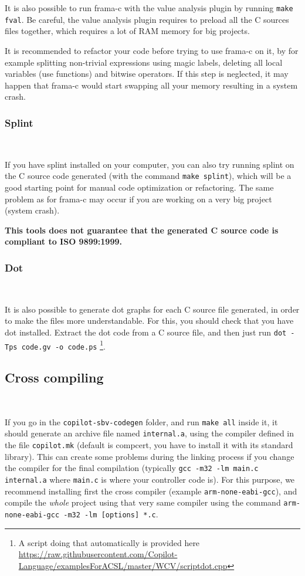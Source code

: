 It is also possible to run frama-c with the value analysis plugin by running
\texttt{make fval}. Be careful, the value analysis plugin requires to preload
all the C sources files together, which requires a lot of RAM memory for big
projects.

It is recommended to refactor your code before trying to use frama-c on it, by for example splitting non-trivial expressions using magic labels, deleting all
local variables (use functions) and bitwise operators. If this step is
neglected, it may happen that frama-c would start swapping all your memory
resulting in a system crash.

\subsubsection{Splint}~\label{subsec:splint}

If you have splint installed on your computer, you can also try running splint on the C source code generated (with the command \texttt{make splint}), which will be a good starting point for manual code optimization or refactoring. The same problem as for frama-c may occur if you are working on a very big project (system crash).

\textbf{This tools does not guarantee that the generated C source code is compliant to ISO 9899:1999.} 

\subsubsection{Dot}~\label{subsec:dot}

It is also possible to generate dot graphs for each C source file generated, in
order to make the files more understandable. For this, you should check that
you have dot installed. Extract the dot code from a C source file, and then
just run \texttt{dot -Tps code.gv -o code.ps}
%
\footnote{A script doing that automatically is provided here
\url{https://raw.githubusercontent.com/Copilot-Language/examplesForACSL/master/WCV/scriptdot.cpp}}.

\subsection{Cross compiling}~\label{sec:cross}

If you go in the \texttt{copilot-sbv-codegen} folder, and run {\tt make all}
inside it, it should generate an archive file named \texttt{internal.a}, using
the compiler defined in the file \texttt{copilot.mk} (default is compcert, you
have to install it with its standard library). This can create some problems
during the linking process if you change the compiler for the final compilation
(typically \texttt{gcc -m32 -lm main.c internal.a} where \texttt{main.c} is
where your controller code is). For this purpose, we recommend installing first
the cross compiler (example \texttt{arm-none-eabi-gcc}), and compile the
\emph{whole} project using that very same compiler using the command \texttt{arm-none-eabi-gcc -m32 -lm [options] *.c}.
